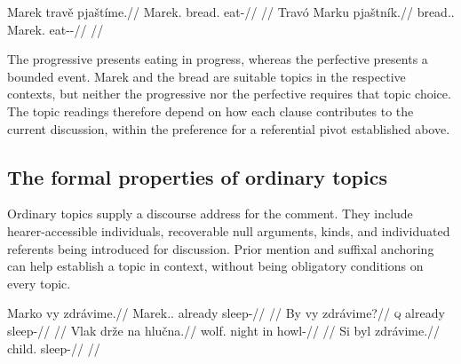 \pex\label{ex:tc-aspect-topic}
\a
\begingl
\gla Marek travě pjaštíme.//
\glb Marek.\Dir{} bread.\Ind{} eat-\Prog{}//
\glft {}
      //
\endgl
\a
\begingl
\gla Travó Marku pjaštník.//
\glb bread.\Dir{}.\Def{} Marek.\Trs{} eat-\Trs{}-\Pf{}//
\glft {}
      //
\endgl
\xe

\noindent The progressive presents eating in progress, whereas the perfective
 presents a bounded event. Marek and the bread are suitable topics in the
 respective contexts, but neither the progressive nor the perfective requires
 that topic choice. The topic readings therefore depend on how each clause
 contributes to the current discussion, within the preference for a
 referential pivot established above.

\subsection{The formal properties of ordinary topics}
\label{sec:tc-ordinary-topics}

Ordinary topics supply a discourse address for the comment. They include
 hearer-accessible individuals, recoverable null arguments, kinds, and
 individuated referents being introduced for discussion. Prior mention and
 suffixal anchoring can help establish a topic in context, without being
 obligatory conditions on every topic.

\pex\label{ex:tc-topic-types}
\a\label{ex:tc-anch-topic}%
\begingl
\gla Marko vy zdrávime.//
\glb Marek.\Dir{}.\Def{} already sleep-\Prog{}//
\glft {} //
\endgl
\a\label{ex:tc-null-topic}%
\begingl
\gla By vy zdrávime?//
\glb \textsc{q} already sleep-\Prog{}//
\glft {} //
\endgl
\a\label{ex:tc-generic-topic}%
\begingl
\gla Vlak drže na hlučna.//
\glb wolf.\Dir{} night in howl-\Cont{}//
\glft {} //
\endgl
\a\label{ex:tc-spec-indef-topic}%
\begingl
\gla Si byl zdrávime.//
\glb \Sanch{} child.\Dir{} sleep-\Prog{}//
\glft {}
      //
\endgl
\xe

